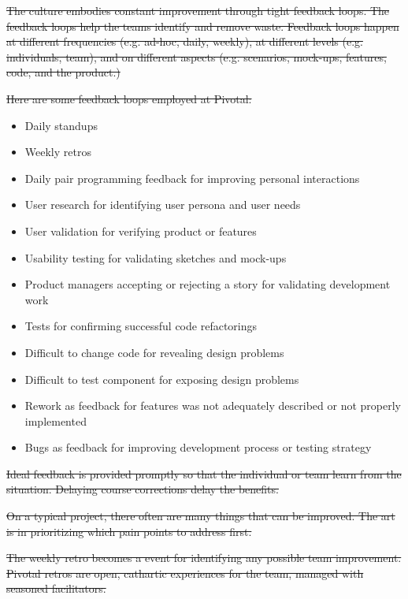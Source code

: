 \sout{The culture embodies constant improvement through tight feedback loops. The feedback loops help the teams identify and remove waste. Feedback loops happen at different frequencies (e.g. ad-hoc, daily, weekly), at different levels (e.g. individuals, team), and on different aspects (e.g. scenarios, mock-ups, features, code, and the product.)}


\sout{Here are some feedback loops employed at Pivotal:}
\begin{itemize}
  \item Daily standups
  \item Weekly retros
  \item Daily pair programming feedback for improving personal interactions
  \item User research for identifying user persona and user needs
  \item User validation for verifying product or features
  \item Usability testing for validating sketches and mock-ups
  \item Product managers accepting or rejecting a story for validating development work
  \item Tests for confirming successful code refactorings 
  \item Difficult to change code for revealing design problems
  \item Difficult to test component for exposing design problems
  \item Rework as feedback for features was not adequately described or not properly implemented
  \item Bugs as feedback for improving development process or testing strategy 
\end{itemize}


\sout{Ideal feedback is provided promptly so that the individual or team learn from the situation. Delaying course corrections delay the benefits.} %


\sout{On a typical project, there often are many things that can be improved. The art is in prioritizing which pain points to address first. }


\sout{The weekly retro becomes a  event for identifying any possible team improvement. Pivotal retros are open, cathartic experiences for the team, managed with seasoned facilitators. }


